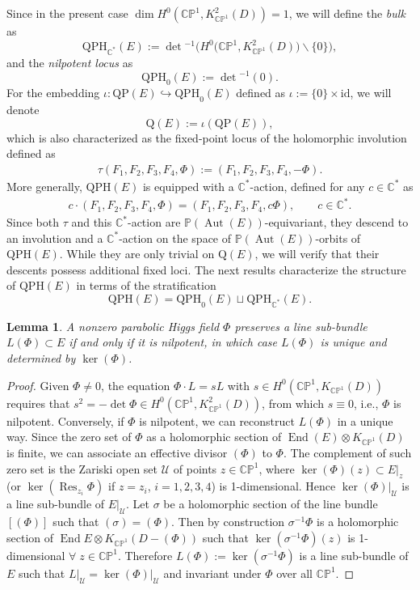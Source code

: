 \documentclass[10pt,a4paper]{amsart}
\newcommand{\field}[1]{\ensuremath{\mathbb{#1}}}
\newcommand{\CC}{\field{C}}
\newcommand{\PP}{\field{P}}
\newcommand{\curly}[1]{\mathscr{#1}}
\newcommand{\cU}{\curly{U}}
\DeclareMathOperator{\Aut}{Aut}
\DeclareMathOperator{\End}{End}
\DeclareMathOperator{\Res}{Res}
\numberwithin{equation}{section}
\newtheorem{Lemma}[Theorem]{Lemma}
\begin{document}
Since in the present case $\dim H^{0}(\CC\PP^{1},K^{2}_{\CC\PP^{1}}(D)) =1$, we will define the \textit{bulk} as
\[
\mathrm{QPH}_{\CC^{*}}(E) := \det{}^{-1}\bigl(H^{0}\big(\CC\PP^{1},K^{2}_{\CC\PP^{1}}(D)\big)\backslash\{0\}\bigr),
\]
and the \emph{nilpotent locus} as
\[
\mathrm{QPH}_{0}(E):=\det{}^{-1}(0).
\]
For the embedding $\iota \colon \mathrm{QP}(E)\hookrightarrow \mathrm{QPH}_{0}(E)$ defined as $\iota:= \{0\}\times\textrm{id}$, we will denote
\[
\mathrm{Q}(E) := \iota(\mathrm{QP}(E)),
\]
which is also characterized as the fixed-point locus of the holomorphic involution defined as
\begin{gather}\label{eq:def-tau}
\tau(F_{1},F_{2},F_{3},F_{4},\Phi):= (F_{1},F_{2},F_{3},F_{4},-\Phi).
\end{gather}
More generally, $\mathrm{QPH}(E)$ is equipped with a $\CC^{*}$-action,
defined for any $c\in\CC^{*}$ as
\begin{gather}\label{eq:def-C*}
c\cdot (F_{1},F_{2},F_{3},F_{4},\Phi) = (F_{1},F_{2},F_{3},F_{4},c\Phi),\qquad c\in\CC^{*}.
\end{gather}
Since both $\tau$ and this $\CC^{*}$-action are $\PP(\Aut(E))$-equivariant, they descend to an involution and a $\CC^{*}$-action on the space of $\PP(\Aut(E))$-orbits of $\mathrm{QPH}(E)$. While they are only trivial on $\mathrm{Q}(E)$, we will verify that their descents
possess additional fixed loci.
The next results characterize the structure of $\mathrm{QPH}(E)$ in terms of the stratification
\[
\mathrm{QPH}(E) = \mathrm{QPH}_{0}(E)\sqcup \mathrm{QPH}_{\CC^{*}}(E).
\]

\begin{Lemma}\label{lemma:nilpotent}
A nonzero parabolic Higgs field $\Phi$ preserves a line sub-bundle $L(\Phi)\subset E$ if and only if it is nilpotent, in which case $L(\Phi)$ is unique and determined by $\ker(\Phi)$.
\end{Lemma}

\begin{proof}
Given $\Phi\neq 0$, the equation $\Phi\cdot L = s L$ with $s\in H^{0}(\CC\PP^{1},K_{\CC\PP^{1}}(D))$ requires that $s^{2} = -\det \Phi\in H^{0}(\CC\PP^{1},K^{2}_{\CC\PP^{1}}(D))$, from which $s\equiv 0$, i.e., $\Phi$ is nilpotent. Conversely, if $\Phi$ is nilpotent, we can reconstruct $L(\Phi)$ in a unique way. Since the zero set of $\Phi$ as a holomorphic section of $\End(E)\otimes K_{\CC\PP^{1}}(D)$ is finite, we can associate an effective divisor $(\Phi)$ to $\Phi$. The complement of such zero set is the Zariski open set $\cU$ of points $z\in\CC\PP^{1}$, where $\ker(\Phi)(z)\subset E\vert_{z}$ (or $\ker(\Res_{z_{i}}\Phi)$ if $z=z_{i}$, $i=1,2,3,4$) is 1-dimensional. Hence $\ker(\Phi)\vert_{\cU}$ is a line sub-bundle of $E\vert_{\cU}$. Let $\sigma$ be a holomorphic section of the line bundle $[(\Phi)]$ such that $(\sigma)=(\Phi)$. Then by construction $\sigma^{-1}\Phi$ is a holomorphic section of $\End E\otimes K_{\CC\PP^{1}}(D-(\Phi))$ such that $\ker(\sigma^{-1}\Phi)(z)$ is 1-dimensional $\forall\; z\in\CC\PP^{1}$. Therefore $L(\Phi):=\ker(\sigma^{-1}\Phi)$ is a line sub-bundle of $E$ such that $L\vert_{\cU} =\ker(\Phi)\vert_{\cU}$ and invariant under $\Phi$ over all $\CC\PP^{1}$.
\end{proof}
\end{document}
